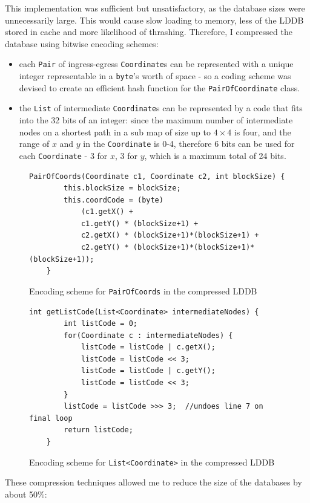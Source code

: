 \documentclass[12pt,twoside,notitlepage]{report}
\begin{document}
\noindent
This implementation was sufficient but unsatisfactory, as the database sizes were unnecessarily large. This would cause slow loading to memory, less of the LDDB stored in cache and more likelihood of thrashing. Therefore, I compressed the database using bitwise encoding schemes:
\begin{itemize}
\item each {\tt Pair} of ingress-egress {\tt Coordinate}s can be represented with a unique integer representable in a {\tt byte}'s worth of space - so a coding scheme was devised to create an efficient hash function for the {\tt PairOfCoordinate} class.
\item the {\tt List} of intermediate {\tt Coordinate}s can be represented by a code that fits into the 32 bits of an integer: since the maximum number of intermediate nodes on a shortest path in a sub map of size up to {$4 \times 4$} is four\footnotemark[2], and the range of $x$ and $y$ in the {\tt Coordinate} is 0-4, therefore 6 bits can be used for each {\tt Coordinate} - 3 for $x$, 3 for $y$, which is a maximum total of 24 bits.
\end{itemize}

\begin{figure}
\begin{lstlisting}
PairOfCoords(Coordinate c1, Coordinate c2, int blockSize) {
		this.blockSize = blockSize;
		this.coordCode = (byte) 
			(c1.getX() + 
			c1.getY() * (blockSize+1) + 
			c2.getX() * (blockSize+1)*(blockSize+1) + 
			c2.getY() * (blockSize+1)*(blockSize+1)*(blockSize+1));
	}
\end{lstlisting}
\caption{Encoding scheme for {\tt PairOfCoords} in the compressed LDDB}
\end{figure}

\begin{figure}
\begin{lstlisting}
int getListCode(List<Coordinate> intermediateNodes) {
		int listCode = 0;
		for(Coordinate c : intermediateNodes) {
			listCode = listCode | c.getX();
			listCode = listCode << 3;
			listCode = listCode | c.getY();
			listCode = listCode << 3;
		}
		listCode = listCode >>> 3;	//undoes line 7 on final loop
		return listCode;
	}
\end{lstlisting}
\caption{Encoding scheme for {\tt List<Coordinate>} in the compressed LDDB}
\end{figure}

\noindent
These compression techniques allowed me to reduce the size of the databases by about 50\%:
\end{document}
